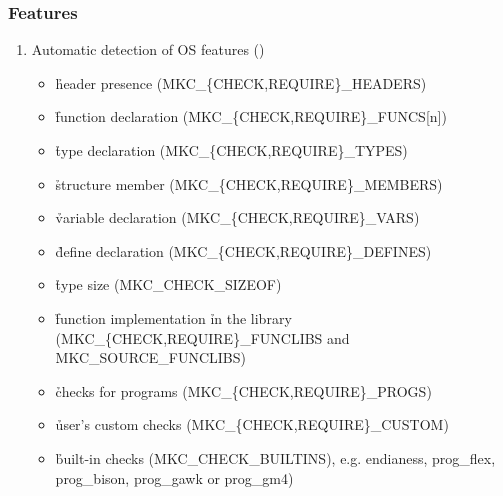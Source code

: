 \documentclass[hyperref={colorlinks=true}]{beamer}
\begin{document}
\begin{frame}[fragile]
  \frametitle{Features}
  \begin{block}{}
  \begin{enumerate}
  \item Automatic detection of OS features
    ()
    \begin{itemize}
    \item \h{header presence} (MKC\_\{CHECK,REQUIRE\}\_HEADERS)
    \item \h{function declaration} (MKC\_\{CHECK,REQUIRE\}\_FUNCS[n])
    \item \h{type declaration} (MKC\_\{CHECK,REQUIRE\}\_TYPES)
    \item \h{structure member} (MKC\_\{CHECK,REQUIRE\}\_MEMBERS)
    \item \h{variable declaration} (MKC\_\{CHECK,REQUIRE\}\_VARS)
    \item \h{define declaration} (MKC\_\{CHECK,REQUIRE\}\_DEFINES)
    \item \h{type size} (MKC\_CHECK\_SIZEOF)
    \item \h{function} implementation \h{in the library}
      (MKC\_\{CHECK,REQUIRE\}\_FUNCLIBS and MKC\_SOURCE\_FUNCLIBS)
    \item \h{checks for programs} (MKC\_\{CHECK,REQUIRE\}\_PROGS)
    \item \h{user's custom checks} (MKC\_\{CHECK,REQUIRE\}\_CUSTOM)
    \item \h{built-in checks} (MKC\_CHECK\_BUILTINS), e.g. endianess,
      prog\_flex, prog\_bison, prog\_gawk or prog\_gm4)
    \end{itemize}
  \end{enumerate}
  \end{block}
\end{frame}
\end{document}
